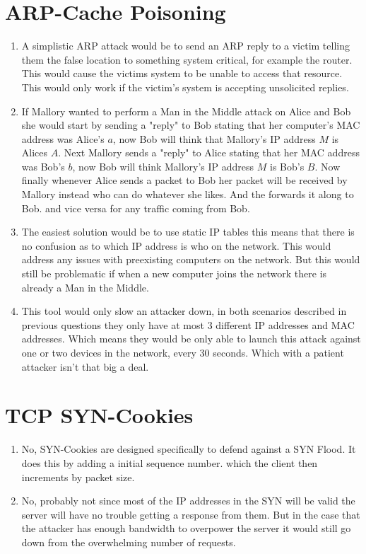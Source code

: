 \documentclass{article}
\begin{document}
\section{ARP-Cache Poisoning}
\begin{enumerate}[A]
	\item A simplistic ARP attack would be to send an ARP reply to a victim
		telling them the false location to something system critical, for
		example the router. This would cause the victims system to be unable to
		access that resource. This would only work if the victim's system is
		accepting unsolicited replies.
	\item If Mallory wanted to perform a Man in the Middle attack on Alice and
		Bob she would start by sending a "reply" to Bob stating that her
		computer's MAC address was Alice's $a$, now Bob will think that
		Mallory's IP address $M$ is Alices $A$. Next Mallory sends a "reply" to
		Alice stating that her MAC address was Bob's $b$, now Bob will think
		Mallory's IP address $M$ is Bob's $B$. Now finally whenever
		Alice sends a packet to Bob her packet will be received by Mallory
		instead who can do whatever she likes. And the forwards it along to Bob.
		and vice versa for any traffic coming from Bob.
	\item The easiest solution would be to use static IP tables this means that
		there is no confusion as to which IP address is who on the network. This
		would address any issues with preexisting computers on the network. But
		this would still be problematic if when a new computer joins the network
		there is already a Man in the Middle.
	\item This tool would only slow an attacker down, in both scenarios
		described in previous questions they only have at most 3 different IP
		addresses and MAC addresses. Which means they would be only able to
		launch this attack against one or two devices in the network, every 30
		seconds. Which with a patient attacker isn't that big a deal.
\end{enumerate}
\section{TCP SYN-Cookies }
\begin{enumerate}[A]
    \item No, SYN-Cookies are designed specifically to defend against a SYN
        Flood. It does this by adding a initial sequence number. which the
        client then increments by packet size.
	\item No, probably not since most of the IP addresses in the SYN will be
		valid the server will have no trouble getting a response from them. But
		in the case that the attacker has enough bandwidth to overpower the
		server it would still go down from the overwhelming number of requests.
\end{enumerate}
\end{document}
